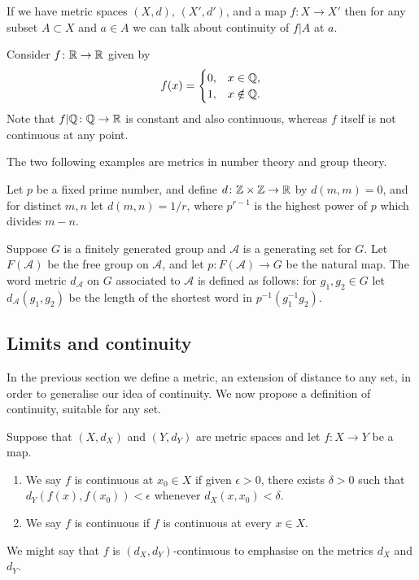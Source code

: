 \documentclass[main.tex]{subfiles}
\begin{document}
			If we have metric spaces $(X,d),\,(X',d')$, and a map $f\colon X \to X'$ then for any subset $A \subset X$ and $a \in A$ we can talk about continuity of $f|A$ at $a$.
		\begin{example}
			Consider $f\colon\mathbb R\to\mathbb R$ given by
			\begin{equation*}
				f(x) = \begin{cases}
					0, & x \in \mathbb Q,\\
					1, & x \notin \mathbb Q.
				\end{cases}
			\end{equation*}
			Note that $f|\mathbb Q \colon \mathbb Q \to \mathbb R$ is constant and also continuous, whereas $f$ itself is not continuous at any point.
		\end{example}
		The two following examples are metrics in number theory and group theory.
		\begin{example}
			Let $p$ be a fixed prime number, and define $d\colon \mathbb Z\times\mathbb Z \to \mathbb R$ by $d(m,m) = 0$, and for distinct $m, n$ let $d(m,n) = 1/r$, where $p^{r - 1}$ is the highest power of $p$ which divides $m - n$.
		\end{example}
		\begin{example}
			Suppose $G$ is a finitely generated group and $\mathcal{A}$ is a generating set for $G$. Let $F(\mathcal{A})$ be the free group on $\mathcal{A}$, and let $p \colon F(\mathcal{A})\to G$ be the natural map. The word metric $d_\mathcal{A}$ on $G$ associated to $\mathcal{A}$ is defined as follows: for $g_1, g_2 \in G$ let $d_\mathcal{A}(g_1, g_2)$ be the length of the shortest word in $p^{-1}(g^{-1}_1g_2)$.
		\end{example}
	\subsection{Limits and continuity}
		In the previous section we define a metric, an extension of distance to any set, in order to generalise our idea of continuity. We now propose a definition of continuity, suitable for any set. 
		\begin{definition}
			Suppose that $(X, d_X)$ and $(Y, d_Y)$ are metric spaces and let $f \colon X \to Y$ be a map.
			\begin{enumerate}
				\item We say $f$ is continuous at $x_0 \in X$ if given $\epsilon > 0$, there exists $\delta > 0$ such that $d_Y(f(x), f(x_0)) < \epsilon$ whenever $d_X(x, x_0) < \delta$.
				\item We say $f$ is continuous if $f$ is continuous at every $x \in X$.
			\end{enumerate}
		\end{definition}
		We might say that $f$ is $(d_X, d_Y)$-continuous to emphasise on the metrics $d_X$ and $d_Y$.
		
\end{document}
